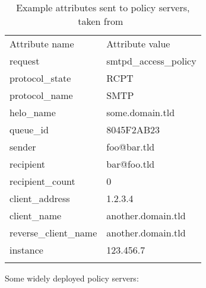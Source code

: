 \begin{table}[thbp]
    \caption{Example attributes sent to policy servers, taken
    from~\cite{policy-servers}}
    \empty{}\label{Example attributes sent to policy servers}
    \centering{}
    \begin{tabular}[]{ll}
        \tabletopline{}%
        Attribute name          & Attribute value           \\
        \tablemiddleline{}%
        request                 & smtpd\_access\_policy     \\
        protocol\_state         & RCPT                      \\
        protocol\_name          & SMTP                      \\
        helo\_name              & some.domain.tld           \\
        queue\_id               & 8045F2AB23                \\
        sender                  & foo@bar.tld               \\
        recipient               & bar@foo.tld               \\
        recipient\_count        & 0                         \\
        client\_address         & 1.2.3.4                   \\
        client\_name            & another.domain.tld        \\
        reverse\_client\_name   & another.domain.tld        \\
        instance                & 123.456.7                 \\
        \tablebottomline{}%
    \end{tabular}
\end{table}

Some widely deployed policy servers:

